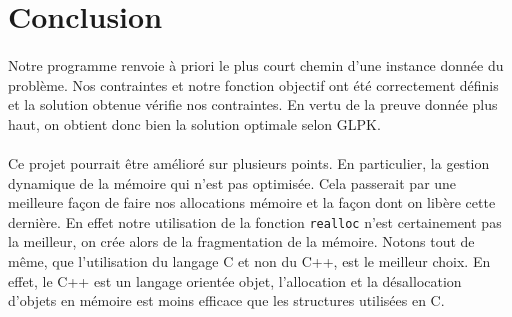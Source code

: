 \documentclass[a4paper,12pt]{article}
\begin{document}
\section*{Conclusion}

\paragraph{}{
	Notre programme renvoie à priori le plus court chemin d'une instance donnée du problème. Nos contraintes et notre fonction objectif ont été correctement définis et la solution obtenue vérifie nos contraintes. En vertu de la preuve donnée plus haut, on obtient donc bien la solution optimale selon GLPK.
}

\paragraph{}{
    Ce projet pourrait être amélioré sur plusieurs points. En particulier, la gestion dynamique de la mémoire qui n'est pas optimisée. Cela passerait par une meilleure façon de faire nos allocations mémoire et la façon dont on libère cette dernière. En effet notre utilisation de la fonction \verb|realloc| n'est certainement pas la meilleur, on crée alors de la fragmentation de la mémoire. Notons tout de même, que l'utilisation du langage C et non du C++, est le meilleur choix. En effet, le C++ est un langage orientée objet, l'allocation et la désallocation d'objets en mémoire est moins efficace que les structures utilisées en C.
}
\end{document}
